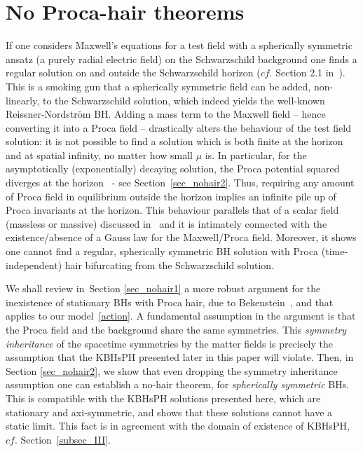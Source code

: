 \documentclass{article}
\numberwithin{equation}{section}
\begin{document}
\section{No Proca-hair theorems}
\label{sec_nohair}
If one considers Maxwell's equations for a test field with a spherically symmetric ansatz (a purely radial electric field) on the Schwarzschild background one finds a regular solution on and outside the Schwarzschild horizon ($cf.$ Section 2.1 in~\cite{Herdeiro:2015waa}). This is a smoking gun that a spherically symmetric field can be added, non-linearly, to the Schwarzschild solution, which indeed yields the well-known Reissner-Nordstr\"om BH. 
Adding a mass term to the Maxwell field -- hence converting it into a Proca field -- drastically alters the behaviour of the test field solution: it is not possible to find a solution which is both finite at the horizon and at spatial infinity, no matter how small $\mu$ is. 
In particular, for the asymptotically (exponentially) decaying solution, the Proca potential squared diverges at the horizon~\cite{Gottlieb:1984jg} - see Section~\ref{sec_nohair2}. Thus, requiring any amount of Proca field in equilibrium outside the horizon implies an infinite pile up of Proca invariants at the horizon. This behaviour parallels that of a scalar field (massless or massive) discussed in~\cite{Herdeiro:2015waa} and it is intimately connected with the existence/absence of a Gauss law for the Maxwell/Proca field. Moreover, it shows one cannot find a regular, spherically symmetric BH solution with Proca (time-independent) hair bifurcating from the Schwarzschild solution.

We shall review in~Section \ref{sec_nohair1} a more robust argument for the inexistence of stationary BHs with Proca hair, due to Bekenstein~\cite{Bekenstein:1971hc,Bekenstein:1972ky}, and that applies to our model~\eqref{action}. A fundamental assumption in the argument is that the Proca field and the background share the same symmetries. This \textit{symmetry inheritance} of the spacetime symmetries by the matter fields is precisely the assumption that  the KBHsPH presented later in this paper will violate. Then, in Section \ref{sec_nohair2}, we show that even dropping the symmetry inheritance assumption one can establish a no-hair theorem, for \textit{spherically symmetric} BHs. This is compatible with the KBHsPH solutions presented here, which are stationary and axi-symmetric, and shows that these solutions cannot have a static limit. This fact is in agreement with the domain of existence of KBHsPH, $cf.$ Section~\ref{subsec_III}.
\end{document}
